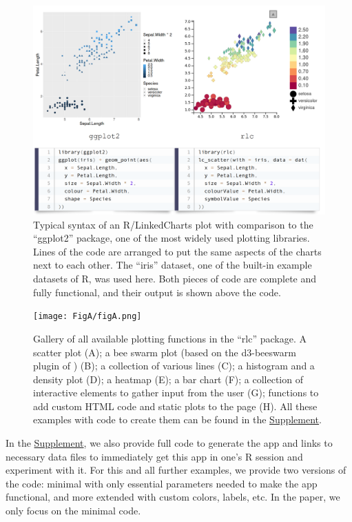 \documentclass[twocolumn,10pt]{article}
\newcommand{\Supplement}{\href{https://anders-biostat.github.io/lc-paper/}{Supplement}}
\begin{document}
\begin{figure}[t]
	\includegraphics[width=\textwidth]{FigB/figB.png}
	\caption{Typical syntax of an R/LinkedCharts plot with comparison to the ``ggplot2'' \citep{wickham_2016} package, one of the most widely used plotting libraries. Lines of the code are arranged to put the same aspects of the charts next to each other. The ``iris'' dataset, one of the built-in example datasets of R, was used here. Both pieces of code are complete and fully functional, and their output is shown above the code.}
	\label{FigB}
\end{figure}



\begin{figure}
	\texttt{[image: FigA/figA.png]}
	\caption{Gallery of all available plotting functions in the ``rlc'' package. A scatter plot (A); a bee swarm plot (based on the d3-beeswarm plugin of \citet{lebeau_2017}) (B); a collection of various lines (C); a histogram and a density plot (D); a heatmap (E); a bar chart (F); a collection of interactive elements to gather input from the user (G); functions to add custom HTML code and static plots to the page (H). All these examples with code to create them can be found in the \Supplement.}
	\label{FigA}
\end{figure}

In the \Supplement, we also provide full code to generate the app and links to necessary data files to immediately get this app in one's R session and experiment with it. For this and all further examples, we provide two versions of the code: minimal with only essential parameters needed to make the app functional, and more extended with custom colors, labels, etc. In the paper, we only focus on the minimal code.
\end{document}
